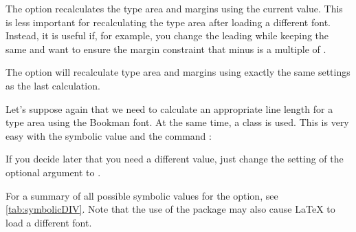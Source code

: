 The option 
recalculates the type area and margins using the current  value. 
This is less important for recalculating the type area after loading a 
different font. Instead, it is useful if, for example, you change the
leading while keeping  the same and want to ensure the 
margin constraint that  minus  is a 
multiple of .

The option  will
recalculate type area and margins using exactly the same settings as the last
calculation.

\begin{Example}
  Let's suppose again that we need to calculate an appropriate line length for
  a type area using the Bookman font. At the same time, a {\KOMAScript} class
  is used. This is very easy with the symbolic value  and the
  command :
If you decide later that you need a different  value, just change the
setting of the optional argument to .
\end{Example}

For a summary of all possible symbolic values for the  option, see
\autoref{tab:symbolicDIV}. Note that the use of the
 package may also cause \LaTeX{} to
load a different font.

\begin{table}
  \caption[{%
  	Symbolic values for the  option and the
  	 argument to %
  }]{%
    Available symbolic values for the  option or
    the  argument to
  }
  \label{tab:symbolicDIV}
  \begin{desctabular}
  \end{desctabular}
\end{table}

